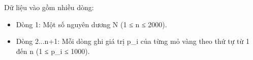 Dữ liệu vào gồm nhiều dòng:  
\begin{itemize}
	\item     Dòng 1: Một số nguyên dương N (1 ≤ n ≤ 2000).   
	\item     Dòng 2...n+1: Mỗi dòng ghi giá trị p\_i của từng mỏ vàng theo thứ tự từ 1 đến n (1 ≤ p\_i ≤ 1000).   
\end{itemize}

\